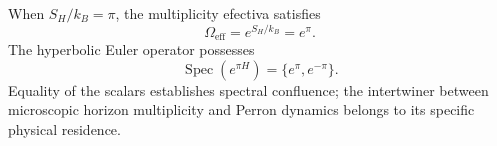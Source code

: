 When \(S_H/k_B=\pi\), the multiplicity efectiva satisfies
\begin{equation}
 \Omega_{\mathrm{eff}}=e^{S_H/k_B}=e^\pi.
 \label{eq:l9s102:omega-e-pi}
\end{equation}
The hyperbolic Euler operator possesses
\begin{equation}
 \operatorname{Spec}(e^{\pi H})=\{e^\pi,e^{-\pi}\}.
 \label{eq:l9s102:e-pi-spectrum}
\end{equation}
Equality of the scalars establishes spectral confluence; the
intertwiner between microscopic horizon multiplicity and Perron
dynamics belongs to its specific physical residence.
